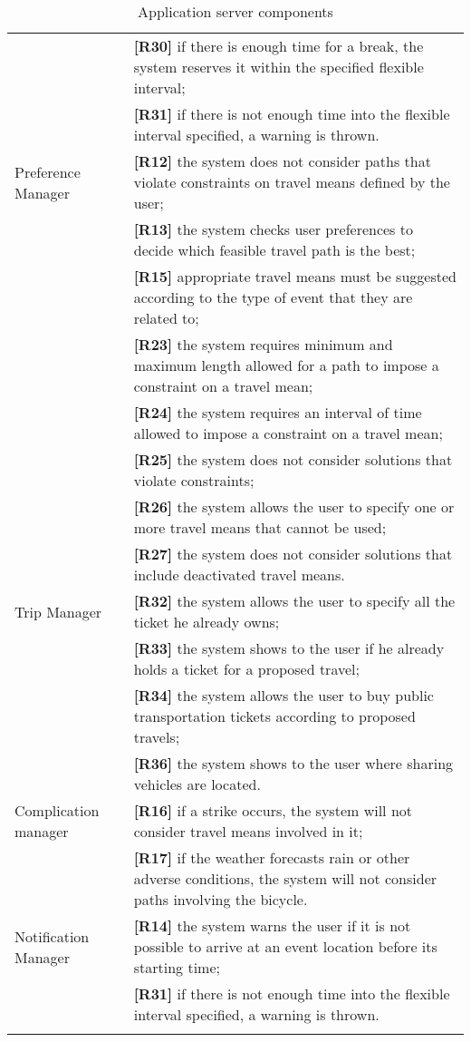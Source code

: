 \begin{center}
\begin{longtable}{ | p{} | p{} | }
		& \textbf{[R30]} if there is enough time for a break, the system reserves it within the specified flexible interval;\\
		& \textbf{[R31]} if there is not enough time into the flexible interval specified, a warning is thrown.\\
		\hline
		Preference Manager & \textbf{[R12]} the system does not consider paths that violate constraints on travel means defined by the user;\\
		& \textbf{[R13]} the system checks user preferences to decide which feasible travel path is the best;\\
		& \textbf{[R15]} appropriate travel means must be suggested according to the type of event that they are related to; \\
		& \textbf{[R23]} the system requires minimum and maximum length allowed for a path to impose a constraint on a travel mean;\\
		& \textbf{[R24]} the system requires an interval of time allowed to impose a constraint on a travel mean;\\
		& \textbf{[R25]} the system does not consider solutions that violate constraints;\\
		& \textbf{[R26]} the system allows the user to specify one or more travel means that cannot be used;\\
		& \textbf{[R27]} the system does not consider solutions that include deactivated travel means.\\
		\hline		
		Trip Manager & \textbf{[R32]} the system allows the user to specify all the ticket he already owns;\\
		& \textbf{[R33]} the system shows to the user if he already holds a ticket for a proposed travel;\\
		& \textbf{[R34]} the system allows the user to buy public transportation tickets according to proposed travels;\\
		& \textbf{[R36]} the system shows to the user where sharing vehicles are located.\\
		\hline
		Complication manager & \textbf{[R16]} if a strike occurs, the system will not consider travel means involved in it;\\
		& \textbf{[R17]} if the weather forecasts rain or other adverse conditions, the system will not consider paths involving the bicycle.\\
		\hline
		Notification Manager & \textbf{[R14]} the system warns the user if it is not possible to arrive at an event location before its starting time;\\
		& \textbf{[R31]} if there is not enough time into the flexible interval specified, a warning is thrown.\\
		\hline
		
		\caption{Application server components}
	\end{longtable}
\end{center}
